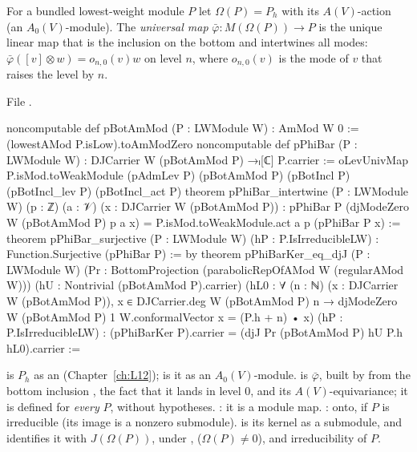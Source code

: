 \begin{definition}\label{l13:def:phibar}
For a bundled lowest-weight module $P$ let $\Omega(P) = P_h$ with its $A(V)$-action (an $A_0(V)$-module). The \emph{universal
map} $\bar\varphi:M(\Omega(P))\to P$ is the unique linear map that is the inclusion on the bottom and intertwines all modes:
$\bar\varphi([v]\otimes w) = o_{n,0}(v)w$ on level $n$, where $o_{n,0}(v)$ is the mode of $v$ that raises the level by $n$.
\end{definition}
\noindent File .
\begin{leancode}
noncomputable def pBotAmMod (P : LWModule W) : AmMod W 0 :=
  (lowestAMod P.isLow).toAmModZero
noncomputable def pPhiBar (P : LWModule W) :
    DJCarrier W (pBotAmMod P) →ₗ[ℂ] P.carrier :=
  oLevUnivMap P.isMod.toWeakModule (pAdmLev P) (pBotAmMod P) (pBotIncl P)
    (pBotIncl_lev P) (pBotIncl_act P)
theorem pPhiBar_intertwine (P : LWModule W) (p : ℤ) (a : 𝒱) (x : DJCarrier W (pBotAmMod P)) :
    pPhiBar P (djModeZero W (pBotAmMod P) p a x)
      = P.isMod.toWeakModule.act a p (pPhiBar P x) :=
theorem pPhiBar_surjective (P : LWModule W) (hP : P.IsIrreducibleLW) :
    Function.Surjective (pPhiBar P) := by
theorem pPhiBarKer_eq_djJ (P : LWModule W)
    (Pr : BottomProjection (parabolicRepOfAMod W (regularAMod W)))
    (hU : Nontrivial (pBotAmMod P).carrier)
    (hL0 : ∀ (n : ℕ) (x : DJCarrier W (pBotAmMod P)), x ∈ DJCarrier.deg W (pBotAmMod P) n →
      djModeZero W (pBotAmMod P) 1 W.conformalVector x = (P.h + n) • x)
    (hP : P.IsIrreducibleLW) :
    (pPhiBarKer P).carrier = (djJ Pr (pBotAmMod P) hU P.h hL0).carrier :=
\end{leancode}

\begin{dictionary}
 is $P_h$ as an  (Chapter~\ref{ch:L12});  is it as an $A_0(V)$-module.
 is $\bar\varphi$, built by  from the bottom inclusion , the fact that it lands in
level $0$, and its $A(V)$-equivariance; it is defined for \emph{every} $P$, without hypotheses. : it is
a module map. : onto, if $P$ is irreducible (its image is a nonzero submodule).  is its
kernel as a submodule, and  identifies it with $J(\Omega(P))$, under , 
($\Omega(P)\neq0$),  and irreducibility of $P$.
\end{dictionary}


